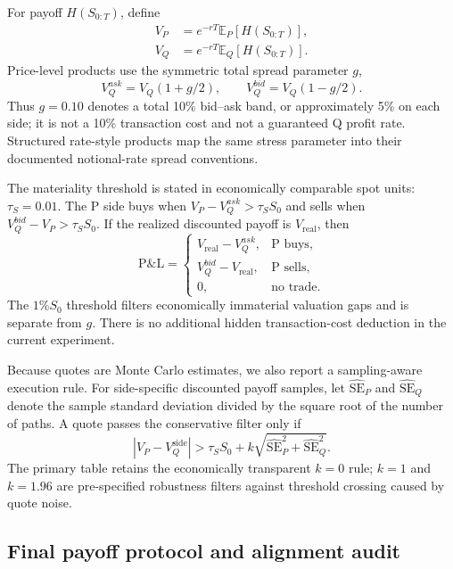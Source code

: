﻿\documentclass[12pt,letterpaper]{article}
\begin{document}
For payoff $H(S_{0:T})$, define
\begin{align}
V_P &= e^{-rT}\mathbb E_P[H(S_{0:T})],\\
V_Q &= e^{-rT}\mathbb E_Q[H(S_{0:T})].
\end{align}
Price-level products use the symmetric total spread parameter $g$,
\begin{equation}
V_Q^{ask}=V_Q(1+g/2),\qquad
V_Q^{bid}=V_Q(1-g/2).
\label{eq:spread}
\end{equation}
Thus $g=0.10$ denotes a total 10\% bid--ask band, or approximately 5\% on
each side; it is not a 10\% transaction cost and not a guaranteed Q profit
rate. Structured rate-style products map the same stress parameter into their
documented notional-rate spread conventions.

The materiality threshold is stated in economically comparable spot units:
$\tau_S=0.01$. The P side buys when $V_P-V_Q^{ask}>\tau_S S_0$ and sells when
$V_Q^{bid}-V_P>\tau_S S_0$. If the realized discounted payoff is
$V_{\mathrm{real}}$, then
\begin{equation}
\mathrm{P\&L}=
\begin{cases}
V_{\mathrm{real}}-V_Q^{ask}, & \text{P buys},\\
V_Q^{bid}-V_{\mathrm{real}}, & \text{P sells},\\
0, & \text{no trade}.
\end{cases}
\end{equation}
The $1\%S_0$ threshold filters economically immaterial valuation gaps and is
separate from $g$. There is no additional hidden transaction-cost deduction in
the current experiment.

Because quotes are Monte Carlo estimates, we also report a sampling-aware
execution rule. For side-specific discounted payoff samples, let
$\widehat{\mathrm{SE}}_P$ and $\widehat{\mathrm{SE}}_Q$ denote the sample
standard deviation divided by the square root of the number of paths. A quote
passes the conservative filter only if
\begin{equation}
|V_P-V_Q^{\mathrm{side}}|>\tau_S S_0
+k\sqrt{\widehat{\mathrm{SE}}_P^2+\widehat{\mathrm{SE}}_Q^2}.
\label{eq:mcfilter}
\end{equation}
The primary table retains the economically transparent $k=0$ rule; $k=1$ and
$k=1.96$ are pre-specified robustness filters against threshold crossing caused
by quote noise.

\subsection{Final payoff protocol and alignment audit}
\end{document}
